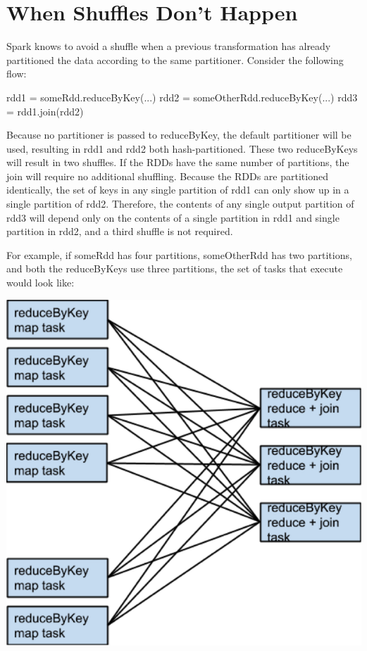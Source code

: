 
\section{When Shuffles Don’t Happen}

Spark knows to avoid a shuffle when a previous transformation has already partitioned the data according
to the same partitioner. Consider the following flow:

rdd1 = someRdd.reduceByKey(...)
rdd2 = someOtherRdd.reduceByKey(...)
rdd3 = rdd1.join(rdd2)

Because no partitioner is passed to reduceByKey, the default partitioner will be used, resulting in 
rdd1 and rdd2 both hash-partitioned. These two reduceByKeys will result in two shuffles. If the RDDs have the 
same number of partitions, the join will require no additional shuffling. Because the RDDs are partitioned 
identically, the set of keys in any single partition of rdd1 can only show up in a single partition of rdd2. 
Therefore, the contents of any single output partition of rdd3 will depend only on the contents of a single 
partition in rdd1 and single partition in rdd2, and a third shuffle is not required.

For example, if someRdd has four partitions, someOtherRdd has two partitions, and both the reduceByKeys use 
three partitions, the set of tasks that execute would look like:

\includegraphics{../../img/spark/spark-tuning-f4.png}

